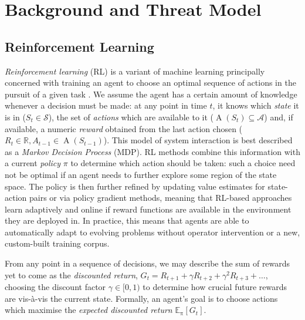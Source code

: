 \documentclass[conference, a4paper, 10pt, times]{IEEEtran}
\begin{document}
\section{Background and Threat Model}
\subsection{Reinforcement Learning}\label{sec:reinforcement-learning}
\emph{Reinforcement learning} (RL) is a variant of machine learning principally concerned with training an agent to choose an optimal sequence of actions in the pursuit of a given task \cite{RL2E}.
We assume the agent has a certain amount of knowledge whenever a decision must be made: at any point in time $t$, it knows which \emph{state} it is in ($S_t \in \mathcal{S}$), the set of \emph{actions} which are available to it ($\operatorname{A}(S_t) \subseteq \mathcal{A}$) and, if available, a numeric \emph{reward} obtained from the last action chosen ($R_t \in \mathbb{R}, A_{t-1} \in \operatorname{A}(S_{t-1})$).
This model of system interaction is best described as a \emph{Markov Decision Process} (MDP).
RL methods combine this information with a current \emph{policy} $\pi$ to determine which action should be taken: such a choice need not be optimal if an agent needs to further explore some region of the state space.
The policy is then further refined by updating value estimates for state-action pairs or via policy gradient methods, meaning that RL-based approaches learn adaptively and online if reward functions are available in the environment they are deployed in.
In practice, this means that agents are able to automatically adapt to evolving problems without operator intervention or a new, custom-built training corpus.

From any point in a sequence of decisions, we may describe the sum of rewards yet to come as the \emph{discounted return}, $G_t = R_{t+1} + \gamma R_{t+2} + \gamma^2 R_{t+3} + \ldots$, choosing the discount factor $\gamma \in [0,1)$ to determine how crucial future rewards are vis-\`{a}-vis the current state.
Formally, an agent's goal is to choose actions which maximise the \emph{expected discounted return} $\operatorname{\mathbb{E}_{\pi}}[G_t]$.

\end{document}
